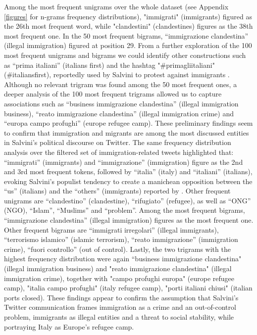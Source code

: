 \documentclass[11pt]{article}
\begin{document}
Among the most frequent unigrams over the whole dataset (see Appendix \ref{figures} for n-grams frequency distributions), "immigrati" (immigrants) figured as the 26th most frequent word, while "clandestini" (clandestines) figures as the 38th most frequent one. In the 50 most frequent bigrams, “immigrazione clandestina” (illegal immigration) figured at position 29. From a further exploration of the 100 most frequent unigrams and bigrams we could identify other constructions such as “prima italiani” (italians first) and the hashtag "\#primagliitaliani"(\#italiansfirst), reportedly used by Salvini to protest against immigrants \citep{evolvi2019emotional}. Although no relevant trigram was found among the 50 most frequent ones, a deeper analysis of the 100 most frequent trigrams allowed us to capture associations such as “business immigrazione clandestina” (illegal immigration business), “reato immigrazione clandestina” (illegal immigration crime) and “europa campo profughi” (europe refugee camp). These preliminary findings seem to confirm that immigration and migrants are among the most discussed entities in Salvini’s political discourse on Twitter.
The same frequency distribution analysis over the filtered set of immigration-related tweets highlighted that: “immigrati” (immigrants) and “immigrazione” (immigration) figure as the 2nd and 3rd most frequent tokens, followed by “italia” (italy) and “italiani” (italians),  evoking Salvini’s populist tendency to create a manichean opposition between the “us” (italians) and the “others” (immigrants) reported by \citet{cervi2020populists}. Other frequent unigrams are “clandestino” (clandestine), “rifugiato” (refugee), as well as “ONG” (NGO), “Islam”, “Muslims” and “problem”. 
Among the most frequent bigrams, “immigrazione clandestina” (illegal immigration) figures as the most frequent one. Other frequent bigrams are “immigrati irregolari” (illegal immigrants), “terrorismo islamico” (islamic terrorism), “reato immigrazione” (immigration crime), “fuori controllo” (out of control). Lastly, the two trigrams with the highest frequency distribution were again “business immigrazione clandestina" (illegal immigration business) and "reato immigrazione clandestina" (illegal immigration crime), together with "campo profughi europa" (europe refugee camp), "italia campo profughi" (italy refugee camp), "porti italiani chiusi" (italian ports closed). These findings appear to confirm the assumption that Salvini’s Twitter communication frames immigration as a crime and an out-of-control problem, immigrants as illegal entities and a threat to social stability, while portraying Italy as Europe’s refugee camp.
\end{document}
